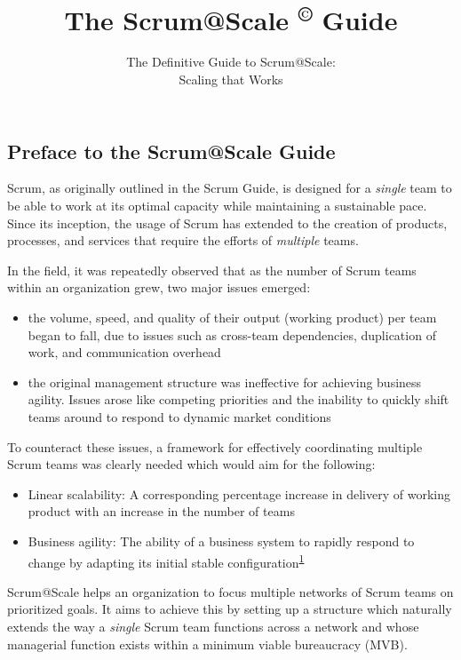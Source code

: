\documentclass[12pt,a4paper,parskip=full]{scrartcl}
\title{\Huge{\color{red}\textbf{The Scrum@Scale 
\textsuperscript{\copyright} 
Guide}}}
\subtitle{\color{gray}The Definitive Guide to Scrum@Scale:\\ Scaling that Works}
\date{}
\begin{document}
\subsection{Preface to the Scrum@Scale
Guide}\label{preface-to-the-ScrumatScale-guide}

Scrum, as originally outlined in the Scrum Guide, is designed for a
\emph{single} team to be able to work at its optimal capacity while
maintaining a sustainable pace. Since its inception, the usage of Scrum
has extended to the creation of products, processes, and services that
require the efforts of \emph{multiple} teams.

In the field, it was repeatedly observed that as the number of Scrum
teams within an organization grew, two major issues emerged:

\begin{itemize}%
\itemsep10pt
\item
  the volume, speed, and quality of their output (working product) per
  team began to fall, due to issues such as cross-team dependencies,
  duplication of work, and communication overhead
\item
  the original management structure was ineffective for achieving
  business agility. Issues arose like competing priorities and the
  inability to quickly shift teams around to respond to dynamic market
  conditions
\end{itemize}

To counteract these issues, a framework for effectively coordinating
multiple Scrum teams was clearly needed which would aim for the
following:

\begin{itemize}
\itemsep1pt\parskip0pt
\item
  Linear scalability: A corresponding percentage increase in delivery of
  working product with an increase in the number of teams
\item
  Business agility: The ability of a business system to rapidly respond
  to change by adapting its initial stable
  configuration\textsuperscript{\hyperref[citation1]{1}}
\end{itemize}

Scrum@Scale helps an organization to focus multiple networks of Scrum
teams on prioritized goals. It aims to achieve this by setting up a
structure which naturally extends the way a \emph{single} Scrum team
functions across a network and whose managerial function exists within a
minimum viable bureaucracy (MVB).
\end{document}
